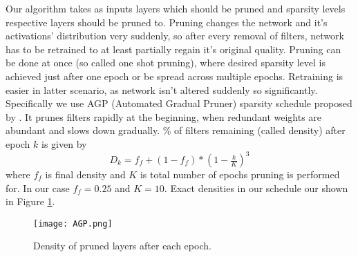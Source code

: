 \documentclass[../Main.tex]{subfiles}
\begin{document}
    Our algorithm takes as inputs layers which should be pruned and sparsity levels
    respective layers should be pruned to. Pruning changes the network and it's activations' distribution
    very suddenly, so after every removal of filters, network has to be retrained to 
    at least partially regain it's original quality. Pruning can be done at once 
    (so called one shot pruning), 
    where desired sparsity level is achieved just after one epoch or be 
    spread across multiple epochs.  Retraining is easier in latter scenario,
    as network isn't altered suddenly so significantly. Specifically we use AGP (Automated
    Gradual Pruner) sparsity schedule proposed by \cite{zhu2017prune}. It prunes
    filters rapidly at the beginning, when redundant weights are abundant
    and slows down gradually. \% of filters remaining (called density) after epoch 
    $k$ is given by
    \[ D_k = f_f + (1-f_f)*(1-\tfrac{k}{K})^3 \]
    where $f_f$ is final density and $K$ is total number of epochs
    pruning is performed for. In our case $f_f=0.25$ and $K=10$. Exact densities
    in our schedule our shown in Figure \ref{fig:AGP}. 
    
        \begin{figure}[h!]
            \texttt{[image: AGP.png]}
            \caption{Density of pruned layers after each epoch. 
            }
            \label{fig:AGP}
        \end{figure}
        

    
\end{document}
